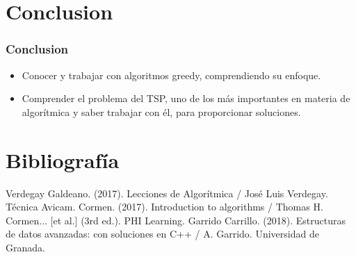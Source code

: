 \documentclass[13pt]{beamer}
\begin{document}
	\section{Conclusion}

    \begin{frame}
		\frametitle{Conclusion}
		\begin{itemize}
			\item Conocer y trabajar con algoritmos greedy, comprendiendo su enfoque.
			\item Comprender el problema del TSP, uno de los más importantes en materia de algorítmica y saber trabajar con él, para proporcionar soluciones.
		\end{itemize}	
	\end{frame}


    \section{Bibliografía}

    \begin{frame}
        \begin{thebibliography}{0}
             Verdegay Galdeano. (2017). Lecciones de Algorítmica / José Luis Verdegay. Técnica Avicam.
             Cormen. (2017). Introduction to algorithms / Thomas H. Cormen... [et al.] (3rd ed.). PHI Learning.
             Garrido Carrillo. (2018). Estructuras de datos avanzadas: con soluciones en C++ / A. Garrido. Universidad de Granada.  
        \end{thebibliography}
    \end{frame}
\end{document}
